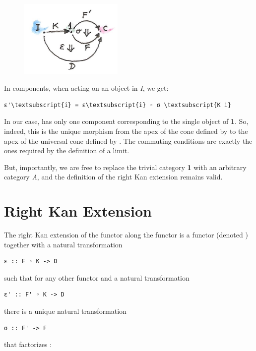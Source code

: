 \begin{figure}[H]
\centering
\includegraphics[width=50mm]{images/kan5.jpg}
\end{figure}

\noindent
In components, when acting on an object  in \emph{I}, we get:

\begin{Verbatim}[commandchars=\\\{\}]
ε'\textsubscript{i} = ε\textsubscript{i} ◦ σ \textsubscript{K i}
\end{Verbatim}
In our case,  has only one component corresponding to the
single object of \textbf{1}. So, indeed, this is the unique morphism
from the apex of the cone defined by  to the apex of
the universal cone defined by . The commuting conditions
are exactly the ones required by the definition of a limit.

But, importantly, we are free to replace the trivial category \textbf{1}
with an arbitrary category \emph{A}, and the definition of the right Kan
extension remains valid.

\section{Right Kan Extension}\label{right-kan-extension}

The right Kan extension of the functor 
along the functor  is a functor
 (denoted ) together with a
natural transformation

\begin{verbatim}
ε :: F ◦ K -> D
\end{verbatim}
such that for any other functor  and
a natural transformation

\begin{verbatim}
ε' :: F' ◦ K -> D
\end{verbatim}
there is a unique natural transformation

\begin{verbatim}
σ :: F' -> F
\end{verbatim}
that factorizes :

